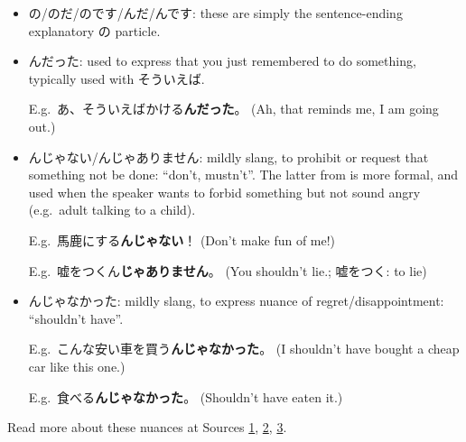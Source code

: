 \documentclass[../nihongo-gakushuu-kyouzai.tex]{subfiles}
\begin{document}
\begin{itemize}
    \item の/のだ/のです/んだ/んです: these are simply the sentence-ending explanatory の particle.
    \item んだった: used to express that you just remembered to do something, typically used with そういえば.

    E.g.\ あ、そういえばかける\textbf{んだった}。 (Ah, that reminds me, I am going out.)

    \item んじゃない/んじゃありません: mildly slang, to prohibit or request that something not be done: ``don't, mustn't''. The latter from is more formal, and used when the speaker wants to forbid something but not sound angry (e.g.\ adult talking to a child).

    E.g.\ 馬鹿にする\textbf{んじゃない}！ (Don't make fun of me!)

    E.g.\ 嘘をつくん\textbf{じゃありません}。 (You shouldn't lie.; 嘘をつく: to lie)

    \item んじゃなかった: mildly slang, to express nuance of regret/disappointment: ``shouldn't have''.

    E.g.\ こんな安い車を買う\textbf{んじゃなかった}。 (I shouldn't have bought a cheap car like this one.)

    E.g.\ 食べる\textbf{んじゃなかった}。 (Shouldn't have eaten it.)
\end{itemize}

Read more about these nuances at Sources \href{https://bunpro.jp/grammar_points/%E3%82%93%E3%81%98%E3%82%83%E3%81%AA%E3%81%84}{1}, \href{https://hinative.com/questions/9228841}{2}, \href{https://ja.hinative.com/questions/5027480}{3}.
\end{document}
